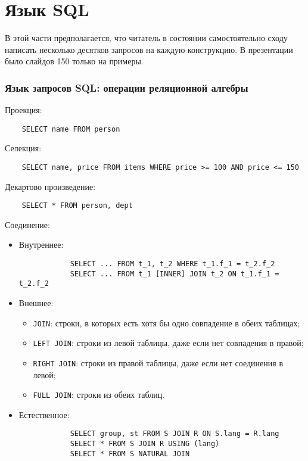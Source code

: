 \part{Язык SQL}

\begin{note}
	В этой части предполагается, что читатель в состоянии самостоятельно сходу написать несколько десятков запросов на каждую конструкцию.
	В презентации было слайдов 150 только на примеры.
\end{note}

\section{Язык запросов SQL: операции реляционной алгебры}

Проекция:
\begin{verbatim}
	SELECT name FROM person
\end{verbatim}

Селекция:
\begin{verbatim}
	SELECT name, price FROM items WHERE price >= 100 AND price <= 150
\end{verbatim}

Декартово произведение:
\begin{verbatim}
	SELECT * FROM person, dept
\end{verbatim}

Соединение:
\begin{itemize}
	\item Внутреннее:
		\begin{verbatim}
			SELECT ... FROM t_1, t_2 WHERE t_1.f_1 = t_2.f_2
			SELECT ... FROM t_1 [INNER] JOIN t_2 ON t_1.f_1 = t_2.f_2
		\end{verbatim}
	\item Внешнее:
		\begin{itemize}
			\item \texttt{JOIN}: строки, в которых есть хотя бы одно совпадение в обеих таблицах;
			\item \texttt{LEFT JOIN}: строки из левой таблицы, даже если нет совпадения в правой;
			\item \texttt{RIGHT JOIN}: строки из правой таблицы, даже если нет соединения в левой;
			\item \texttt{FULL JOIN}: строки из обеих таблиц.
		\end{itemize}
	\item Естественное:
		\begin{verbatim}
			SELECT group, st FROM S JOIN R ON S.lang = R.lang
			SELECT * FROM S JOIN R USING (lang)
			SELECT * FROM S NATURAL JOIN
		\end{verbatim}
\end{itemize}

